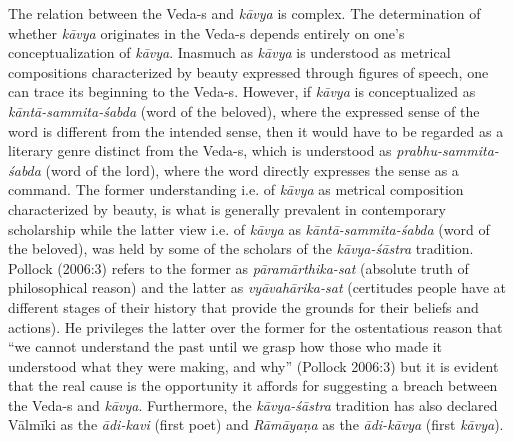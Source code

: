 The relation between the Veda-s and \textsl{kāvya} is complex. The determination of whether \textsl{kāvya} originates in the Veda-s depends entirely on one's conceptualization of \textsl{kāvya}. Inasmuch as \textsl{kāvya} is understood as metrical compositions characterized by beauty expressed through figures of speech, one can trace its beginning to the Veda-s. However, if \textsl{kāvya} is conceptualized as \textsl{kāntā-sammita-śabda} (word of the beloved), where the expressed sense of the word is different from the intended sense, then it would have to be regarded as a literary genre distinct from the Veda-s, which is understood as \textsl{prabhu-sammita-śabda} (word of the lord), where the word directly expresses the sense as a command. The former understanding i.e. of \textsl{kāvya} as metrical composition characterized by beauty, is what is generally prevalent in contemporary scholarship while the latter view i.e. of \textsl{kāvya} as \textsl{kāntā-sammita-śabda} (word of the beloved), was held by some of the scholars of the \textsl{kāvya-śāstra} tradition. Pollock (2006:3) refers to the former as \textsl{pāramārthika-sat} (absolute truth of philosophical reason) and the latter as \textsl{vyāvahārika-sat} (certitudes people have at different stages of their history that provide the grounds for their beliefs and actions). He privileges the latter over the former for the ostentatious reason that ``we cannot understand the past until we grasp how those who made it understood what they were making, and why'' (Pollock 2006:3) but it is evident that the real cause is the opportunity it affords for suggesting a breach between the Veda-s and \textsl{kāvya}. Furthermore, the \textsl{kāvya-śāstra} tradition has also declared Vālmīki as the \textsl{ādi-kavi} (first poet) and \textsl{Rāmāyaṇa} as the \textsl{ādi-kāvya} (first \textsl{kāvya}). 

\newpage

